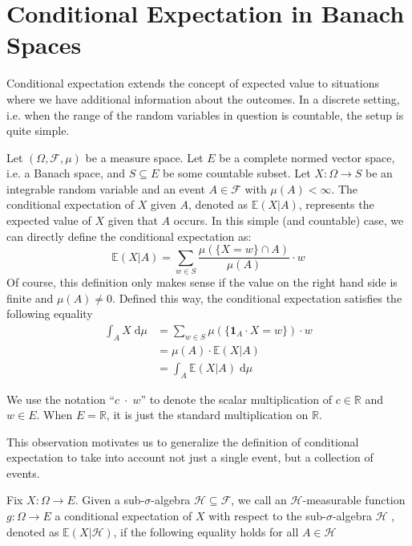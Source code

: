 ﻿%

\chapter{Conditional Expectation in Banach Spaces}\label{chapter:conditional_expectation}

Conditional expectation extends the concept of expected value to situations where we have additional information about the outcomes. In a discrete setting, i.e. when the range of the random variables in question is countable, the setup is quite simple. 
\par Let $(\Omega, \mathcal{F}, \mu)$ be a measure space. Let $E$ be a complete normed vector space, i.e. a Banach space, and $S \subseteq E$ be some countable subset. Let $X : \Omega \rightarrow S$ be an integrable random variable and an event $A \in \mathcal{F}$ with $\mu(A) < \infty$. The conditional expectation of $X$ given $A$, denoted as $\mathbb{E}(X \vert A)$, represents the expected value of $X$ given that $A$ occurs. In this simple (and countable) case, we can directly define the conditional expectation as:
\[
	\mathbb{E}(X \vert A) = \sum_{w \in S} \frac{\mu(\{X = w\} \cap A)}{\mu(A)} \cdot w
\]
Of course, this definition only makes sense if the value on the right hand side is finite and $\mu(A) \neq 0$. Defined this way, the conditional expectation satisfies the following equality
\begin{align*}
	\int_A X \; \textrm{d} \mu &= \sum_{w \in S} \mu(\{\mathbf{1}_A \cdot X = w\}) \cdot w\\
	&= \mu(A) \cdot \mathbb{E}(X \vert A) \\
	&= \int_A \mathbb{E}(X \vert A) \; \textrm{d} \mu
\end{align*}

\begin{remark}
	We use the notation ``$c \; \cdot \; w$'' to denote the scalar multiplication of $c \in \mathbb{R}$ and $w \in E$. When $E = \mathbb{R}$, it is just the standard multiplication on $\mathbb{R}$. 
\end{remark}

This observation motivates us to generalize the definition of conditional expectation to take into account not just a single event, but a collection of events. 

Fix $X : \Omega \rightarrow E$. Given a sub-$\sigma$-algebra $\mathcal{H} \subseteq \mathcal{F}$, we call an $\mathcal{H}$-measurable function $g : \Omega \rightarrow E$ a conditional expectation of $X$ with respect to the sub-$\sigma$-algebra $\mathcal{H}$ , denoted as $\mathbb{E}(X \vert \mathcal{H})$, if the following equality holds for all $A \in \mathcal{H}$

